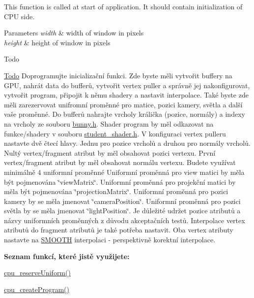 This function is called at start of application. It should contain initialization of C\-P\-U side. 


\begin{DoxyParams}{Parameters}
{\em width} & width of window in pixels \\
\hline
{\em height} & height of window in pixels \\
\hline
\end{DoxyParams}
\begin{DoxyRefDesc}{Todo}
\item[\hyperlink{todo__todo000001}{Todo}]Doprogramujte inicializační funkci. Zde byste měli vytvořit buffery na G\-P\-U, nahrát data do bufferů, vytvořit vertex puller a správně jej nakonfigurovat, vytvořit program, připojit k němu shadery a nastavit interpolace. Také byste zde měli zarezervovat unifromní proměnné pro matice, pozici kamery, světla a další vaše proměnné. Do bufferů nahrajte vrcholy králička (pozice, normály) a indexy na vrcholy ze souboru \hyperlink{bunny_8h}{bunny.\-h}. Shader program by měl odkazovat na funkce/shadery v souboru \hyperlink{student__shader_8h}{student\-\_\-shader.\-h}. V konfiguraci vertex pulleru nastavte dvě čtecí hlavy. Jednu pro pozice vrcholů a druhou pro normály vrcholů. Nultý vertex/fragment atribut by měl obsahovat pozici vertexu. První vertex/fragment atribut by měl obsahovat normálu vertexu. Budete využívat minimálně 4 uniformní proměnné Uniformní proměnná pro view matici by měla být pojmenována \char`\"{}view\-Matrix\char`\"{}. Uniformní proměnná pro projekční matici by měla být pojmenována \char`\"{}projection\-Matrix\char`\"{}. Uniformní proměnná pro pozici kamery by se měla jmenovat \char`\"{}camera\-Position\char`\"{}. Uniformní proměnná pro pozici světla by se měla jmenovat \char`\"{}light\-Position\char`\"{}. Je důležité udržet pozice atributů a názvy uniformních proměnných z důvodu akceptačních testů. Interpolace vertex atributů do fragment atributů je také potřeba nastavit. Oba vertex atributy nastavte na \hyperlink{program_8h_a8472f01c511d77bbfb981a46618ea1eaa33c7ccbb848d8fd75455dd9786a1153a}{S\-M\-O\-O\-T\-H} interpolaci -\/ perspektivně korektní interpolace.\par
 {\bfseries Seznam funkcí, které jistě využijete\-:}
\begin{DoxyItemize}
\item \hyperlink{uniforms_8h_acd308bcb7720918cb48f75292a247dfb}{cpu\-\_\-reserve\-Uniform()}
\item \hyperlink{program_8h_a4fca7a0e3dac7f93620a1bde6efcde16}{cpu\-\_\-create\-Program()}

\end{DoxyItemize}
\end{DoxyRefDesc}
